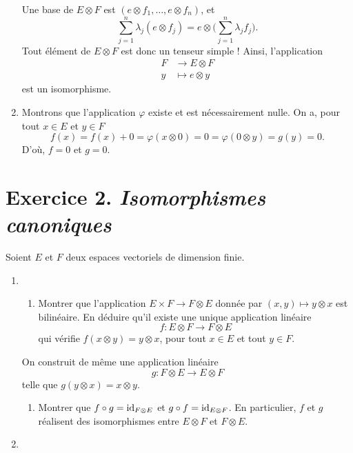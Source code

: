 \documentclass[./main]{subfiles}
\begin{document}
\begin{enumerate}
      Une base de $E \otimes F$ est $(e \otimes f_1, \ldots, e \otimes f_n)$, et \[
      \sum_{j=1}^n \lambda_j (e \otimes f_j) = e \otimes \Big(\sum_{j=1}^n \lambda_j f_j\Big)
      .\]
      Tout élément de $E \otimes F$ est donc un tenseur simple !
      Ainsi, l'application  \begin{align*}
        F &\longrightarrow E\otimes F \\
        y &\longmapsto e \otimes y
      \end{align*} est un isomorphisme.
    \item Montrons que l'application $\varphi$ existe et est nécessairement nulle.
      On a, pour tout $x \in E$ et $y \in F$ \[
      f(x) = f(x) + 0 = \varphi(x \otimes 0) = 0 = \varphi(0 \otimes y) = g(y) = 0
      .\]
      D'où, $f = 0$ et $g = 0$.
  \end{enumerate}

  \section{Exercice 2. \textit{Isomorphismes canoniques}}
  \begin{enonce}
    Soient $E$ et $F$ deux espaces vectoriels de dimension finie.
    \begin{enumerate}
      \item 
        \begin{enumerate}
          \item Montrer que l'application $E \times F \to F \otimes E$ donnée par $(x,y) \mapsto y \otimes x$ est bilinéaire.
            En déduire qu'il existe une unique application linéaire \[
            f : E \otimes F \to F \otimes E
            \] qui vérifie $f(x \otimes y) = y \otimes x$, pour tout $x \in E$ et tout $y \in F$.
        \end{enumerate}
        On construit de même une application linéaire \[
        g : F \otimes E \to E \otimes F
        \]telle que $g(y \otimes x) = x \otimes y$.
        \begin{enumerate}[resume*]
          \item Montrer que $f \circ g = \operatorname{id}_{F \otimes E}$ et $g \circ f = \operatorname{id}_{E \otimes F}$.
            En particulier, $f$ et $g$ réalisent des isomorphismes entre $E \otimes F$ et  $F \otimes E$.
        \end{enumerate}
      \item 
    \end{enumerate}
  \end{enonce}
\end{document}
